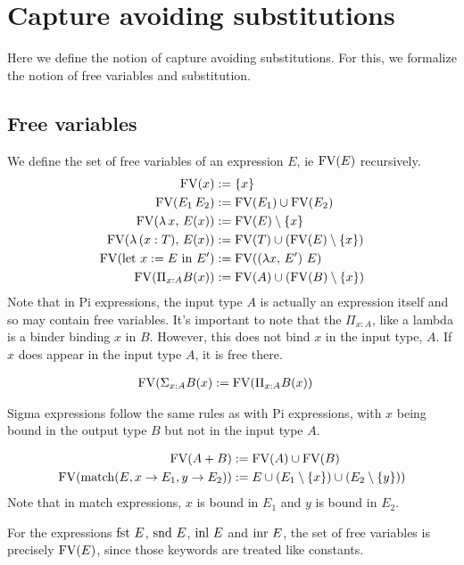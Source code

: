 \documentclass{article}
\begin{document}
\section{Capture avoiding substitutions}
Here we define the notion of capture avoiding substitutions. For this, we
formalize the notion of free variables and substitution.

\subsection{Free variables}
We define the set of free variables of an expression $E$, ie $\operatorname{FV}(E)$ recursively.
\begin{align*}
  \operatorname{FV} (x) &:= \{x\} \\
  \operatorname{FV} (E_1 \, E_2) &:= \operatorname{FV}(E_1) \cup \operatorname{FV}(E_2) \\
  \operatorname{FV} (\lambda \, x, \, E(x)) &:= \operatorname{FV}(E) \setminus \{x\} \\
  \operatorname{FV} (\lambda \, (x : T), \, E(x)) &:= \operatorname{FV}(T) \cup (\operatorname{FV}(E) \setminus \{x\}) \\
  \operatorname{FV} (\text{let } x := E \text{ in } E') &:= \operatorname{FV}((\lambda x, \, E') \,\, E) \\
  \operatorname{FV} (\Pi_{x : A} B(x)) &:= \operatorname{FV}(A) \cup (\operatorname{FV}(B) \setminus \{x\})
\end{align*}
Note that in Pi expressions, the input type $A$ is actually an expression itself
and so may contain free variables. It's important to note that the $\Pi_{x :
  A}$, like a lambda is a binder binding $x$ in $B$. However, this does not bind
$x$ in the input type, $A$. If $x$ does appear in the input type $A$, it is
free there.

\begin{align*}
 \operatorname{FV} (\Sigma_{x : A} B(x) &:= \operatorname{FV}(\Pi_{x : A} B(x))
\end{align*}

Sigma expressions follow the same rules as with Pi expressions, with $x$ being
bound in the output type $B$ but not in the input type $A$.

\begin{align*}
  \operatorname{FV} (A + B) &:= \operatorname{FV}(A) \cup \operatorname{FV}(B) \\
  \operatorname{FV} (\operatorname{match}(E, x \rightarrow E_1, y \rightarrow E_2)) &:= 
    E \cup (E_1 \setminus \{x\}) \cup (E_2 \setminus \{y\}))
\end{align*}
Note that in match expressions, $x$ is bound in $E_1$ and $y$ is bound in $E_2$.

For the expressions $\operatorname{fst} \, E$, $\operatorname{snd} \, E$, $\operatorname{inl} \, E$ and $\operatorname{inr} \, E$, the
set of free variables is precisely $\operatorname{FV}(E)$, since those keywords are treated
like constants.
\end{document}
